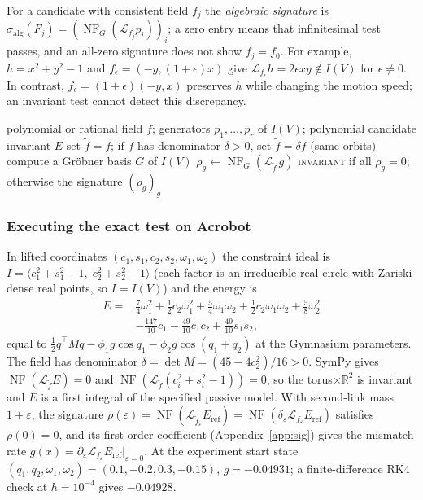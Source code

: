 \documentclass[10pt]{article}
\theoremstyle{definition}
\DeclareMathOperator{\NF}{NF}
\newcommand{\Lie}{\mathcal{L}}
\newcommand{\Eref}{E_{\mathrm{ref}}}
\begin{document}
For a candidate with consistent field $f_j$ the \emph{algebraic signature}
is $\sigma_{\mathrm{alg}}(F_j)=(\NF_G(\Lie_{f_j}p_i))_i$; a zero entry means
that infinitesimal test passes, and an all-zero signature does not show
$f_j=f_0$. For example, $h=x^2+y^2-1$ and $f_\epsilon=(-y,(1+\epsilon)x)$
give $\Lie_{f_\epsilon}h=2\epsilon xy\notin I(V)$ for $\epsilon\ne0$.
In contrast, $\hat f_\epsilon=(1+\epsilon)(-y,x)$ preserves $h$ while
changing the motion speed; an invariant test cannot detect this discrepancy.

\begin{algorithm}[htbp]
\caption{Symbolic invariance test}\label{alg:exact}
\begin{algorithmic}[1]
\Require polynomial or rational field $f$; generators $p_1,\dots,p_r$ of $I(V)$; polynomial candidate invariant $E$
\State set $\tilde f=f$; if $f$ has denominator $\delta>0$, set $\tilde f=\delta f$ (same orbits)
\State compute a Gr\"obner basis $G$ of $I(V)$
  \State $\rho_g\leftarrow\NF_G(\Lie_{\tilde f}\,g)$
\EndFor
\State \Return \textsc{invariant} if all $\rho_g=0$; otherwise the signature $(\rho_g)_g$
\end{algorithmic}
\end{algorithm}

\subsubsection{Executing the exact test on Acrobot}\label{sec:acrobot-cert}

In lifted coordinates $(c_1,s_1,c_2,s_2,\omega_1,\omega_2)$ the constraint
ideal is $I=\langle c_1^2+s_1^2-1,\;c_2^2+s_2^2-1\rangle$ (each factor is
an irreducible real circle with Zariski-dense real points, so $I=I(V)$) and
the energy \citep{gebrekidan2026diagnosing} is
\begin{equation}\label{eq:acrobot-energy}
\begin{aligned}
E={}&\tfrac74\omega_1^2+\tfrac12c_2\omega_1^2+\tfrac54\omega_1\omega_2
+\tfrac12c_2\omega_1\omega_2+\tfrac58\omega_2^2\\
&-\tfrac{147}{10}c_1-\tfrac{49}{10}c_1c_2+\tfrac{49}{10}s_1s_2 ,
\end{aligned}
\end{equation}
equal to $\tfrac12\dot q^\top M\dot q-\phi_1g\cos q_1-\phi_2g\cos(q_1+q_2)$
at the Gymnasium parameters. The field has denominator
$\delta=\det M=(45-4c_2^2)/16>0$. SymPy gives
$\NF(\Lie_{\tilde f}E)=0$ and $\NF(\Lie_{\tilde f}(c_i^2+s_i^2-1))=0$, so
the torus$\times\mathbb R^2$ is invariant and $E$ is a first integral of the
specified passive model. With second-link mass $1+\varepsilon$, the
signature $\rho(\varepsilon)=\NF(\Lie_{\tilde f_\varepsilon}\Eref)=\NF(\delta_\varepsilon\Lie_{f_\varepsilon}\Eref)$ satisfies
$\rho(0)=0$, and its first-order coefficient (Appendix~\ref{app:sig}) gives
the mismatch rate
$g(x)=\partial_\varepsilon\Lie_{f_\varepsilon}\Eref|_{\varepsilon=0}$.
At the experiment start state $(q_1,q_2,\omega_1,\omega_2)=(0.1,-0.2,0.3,-0.15)$,
$g=-0.04931$; a finite-difference RK4 check
at $h=10^{-4}$ gives $-0.04928$.
\end{document}
